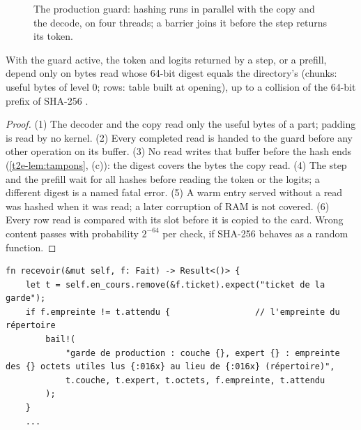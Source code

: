 \begin{figure}[ht]
\centering
\SchemaResGarde
\caption[The production guard]{The production guard: hashing runs in parallel with the copy and the decode, on four threads; a barrier joins it before the step returns its token.}
\label{t2e-fig:garde}
\end{figure}

\begin{proposition}\label{t2e-prop:garde}
With the guard active, the token and logits returned by a step, or a prefill, depend only on bytes read whose 64-bit digest equals the directory's (chunks: useful bytes of level 0; rows: table built at opening), up to a collision of the 64-bit prefix of SHA-256 \cite{fips180-4}.
\end{proposition}
\begin{proof}
(1) The decoder and the copy read only the useful bytes of a part; padding is read by no kernel. (2) Every completed read is handed to the guard before any other operation on its buffer. (3) No read writes that buffer before the hash ends (\cref{t2e-lem:tampons}, (c)): the digest covers the bytes the copy read. (4) The step and the prefill wait for all hashes before reading the token or the logits; a different digest is a named fatal error. (5) A warm entry served without a read was hashed when it was read; a later corruption of RAM is not covered. (6) Every row read is compared with its slot before it is copied to the card. Wrong content passes with probability $2^{-64}$ per check, if SHA-256 behaves as a random function.
\end{proof}

\begin{lstlisting}[language=RustRes, caption={The guard turns a wrong chunk into a named fatal error (\fichier{moteur/crates/trc-ordo/src/garde.rs}, excerpt; the message is in French).}, label=t2e-lst:garde]
fn recevoir(&mut self, f: Fait) -> Result<()> {
    let t = self.en_cours.remove(&f.ticket).expect("ticket de la garde");
    if f.empreinte != t.attendu {                 // l'empreinte du répertoire
        bail!(
            "garde de production : couche {}, expert {} : empreinte des {} octets utiles lus {:016x} au lieu de {:016x} (répertoire)",
            t.couche, t.expert, t.octets, f.empreinte, t.attendu
        );
    }
    ...
\end{lstlisting}

